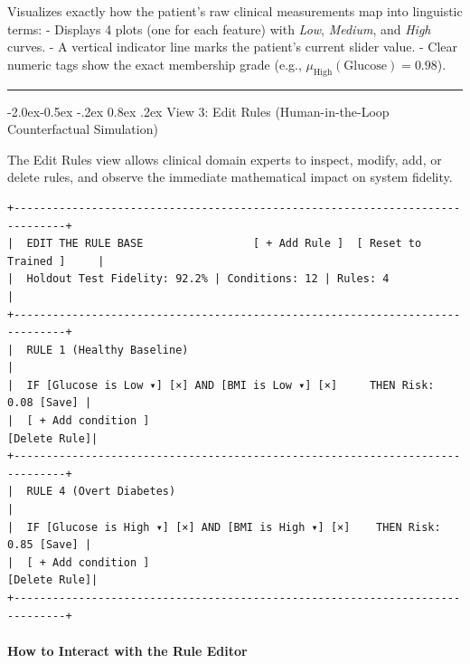 \documentclass[10pt,a4paper]{article}
\makeatletter
\renewcommand\subsubsection{\@startsection{subsubsection}{3}{\z@}%
                                     {-2.0ex\@plus -0.5ex \@minus -.2ex}%
                                     {0.8ex \@plus .2ex}%
                                     {\normalfont\normalsize\bfseries\color{accent}}}
\makeatother
\begin{document}
Visualizes exactly how the patient's raw clinical measurements map into
linguistic terms: - Displays 4 plots (one for each feature) with
\emph{Low}, \emph{Medium}, and \emph{High} curves. - A vertical
indicator line marks the patient's current slider value. - Clear numeric
tags show the exact membership grade (e.g.,
\(\mu_{\text{High}}(\text{Glucose}) = 0.98\)).

\begin{center}\rule{0.5\linewidth}{0.5pt}\end{center}

\subsubsection{View 3: Edit Rules (Human-in-the-Loop Counterfactual
Simulation)}\label{view-3-edit-rules-human-in-the-loop-counterfactual-simulation}

The Edit Rules view allows clinical domain experts to inspect, modify,
add, or delete rules, and observe the immediate mathematical impact on
system fidelity.

\begin{verbatim}
+------------------------------------------------------------------------------+
|  EDIT THE RULE BASE                 [ + Add Rule ]  [ Reset to Trained ]     |
|  Holdout Test Fidelity: 92.2% | Conditions: 12 | Rules: 4                    |
+------------------------------------------------------------------------------+
|  RULE 1 (Healthy Baseline)                                                   |
|  IF [Glucose is Low ▾] [×] AND [BMI is Low ▾] [×]     THEN Risk: 0.08 [Save] |
|  [ + Add condition ]                                            [Delete Rule]|
+------------------------------------------------------------------------------+
|  RULE 4 (Overt Diabetes)                                                     |
|  IF [Glucose is High ▾] [×] AND [BMI is High ▾] [×]    THEN Risk: 0.85 [Save] |
|  [ + Add condition ]                                            [Delete Rule]|
+------------------------------------------------------------------------------+
\end{verbatim}

\paragraph{How to Interact with the Rule
Editor}\label{how-to-interact-with-the-rule-editor}
\end{document}
